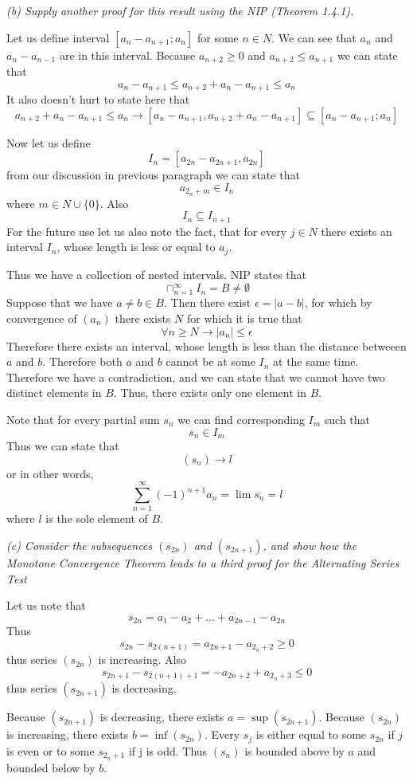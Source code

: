 \documentclass[11pt,oneside,titlepage]{book}
\begin{document}
\textit{(b) Supply another proof for this result using the NIP (Theorem 1.4.1).
}

Let us define  interval $[a_n - a_{n + 1}; a_n]$ for some $n \in N$.
We can see that
$a_n$ and $a_n - a_{n - 1}$ are in this interval. Because
$a_{n + 2} \geq 0$ and  $a_{n + 2} \leq a_{n + 1}$ we can state that
$$a_n - a_{n + 1} \leq a_{n + 2} + a_n - a_{n + 1} \leq a_n$$
It also doesn't hurt to state here that
$$a_{n + 2} + a_n - a_{n + 1} \leq a_n \to [a_n - a_{n + 1}, a_{n + 2} + a_n - a_{n + 1}] \subseteq [a_n - a_{n + 1}; a_n]$$

Now let us define
$$I_n = [a_{2n} - a_{2n + 1}, a_{2n}]$$
from our discussion in previous paragraph we can state that
$$a_{2_n + m} \in I_n$$
where $m \in N \cup \{0\}$. Also
$$I_n \subseteq I_{n+1}$$
For the future use let us also note the fact, that for every $j \in N$ there
exists an interval $I_n$, whose length is less or equal to $a_j$.

Thus we have a collection of nested intervals. NIP states that
$$\cap_{n = 1}^{\infty} I_n = B \neq \emptyset$$
Suppose that we have $a \neq b \in B$. Then there exist $\epsilon = |a - b|$,
for which by convergence of $(a_n)$ there exists $N$ for which it is true that
$$\forall n \geq N \to |a_n| \leq \epsilon$$
Therefore there exists  an interval, whose length is less than the distance
betweeen $a$ and $b$. Therefore both $a$ and $b$  cannot be at some $I_n$ at
the same time. Therefore  we have a contradiction, and we can state that we
cannot have two distinct elements in $B$. Thus,  there exists
only one element in $B$.

Note that for every partial sum $s_n$ we can find corresponding $I_m$ such that
$$s_n \in I_m$$
Thus we can state that
$$(s_n)\to l$$
or in other words, 
$$\sum_{n = 1}^{\infty} (-1)^{n + 1}a_n = \lim s_n = l$$
where $l$ is the sole element of $B$.

\textit{(c) Consider the subsequences $(s_{2n})$ and $(s_{2n + 1})$, and show
  how the Monotone Convergence Theorem leads to a third proof for the
  Alternating Series Test}

Let us note that
$$s_{2n} = a_1 - a_2 + ... + a_{2n - 1} - a_{2n}$$
Thus
$$s_{2n} - s_{2(n + 1)} = a_{2n + 1} - a_{2_n + 2} \geq 0$$
thus series $(s_{2n})$ is increasing. Also
$$s_{2n + 1 } - s_{2(n + 1) + 1} = - a_{2n + 2} + a_{2_n + 3} \leq 0$$
thus series $(s_{2n + 1})$ is decreasing.

Because $(s_{2n + 1})$ is decreasing, there exists $a = \sup(s_{2n + 1})$.
Because $(s_{2n})$ is increasing, there exists $b = \inf(s_{2n})$.
Every $s_j$ is either equal to some $s_{2n}$ if $j$ is even or to some
$s_{2_n + 1}$ if j is odd. Thus $(s_n)$ is bounded above by $a$ and bounded
below by $b$.
\end{document}
